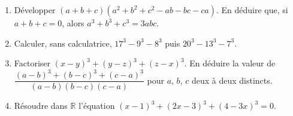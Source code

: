 
\begin{enumerate}
  \item Développer $(a+b+c)(a^2+b^2+c^2-ab-bc-ca)$. En déduire que, si $a+b+c=0$, alors $a^3+b^3+c^3=3abc$.
  \item Calculer, sans calculatrice, $17^3-9^3-8^3$ puis $20^3-13^3-7^3$.
  \item Factoriser $(x-y)^3+(y-z)^3+(z-x)^3$. En déduire la valeur de $\dfrac{(a-b)^3+(b-c)^3+(c-a)^3}{(a-b)(b-c)(c-a)}$ pour $a$, $b$, $c$ deux à deux distincts.
  \item Résoudre dans $\mathbb R$ l'équation $(x-1)^3+(2x-3)^3+(4-3x)^3=0$.
\end{enumerate}

